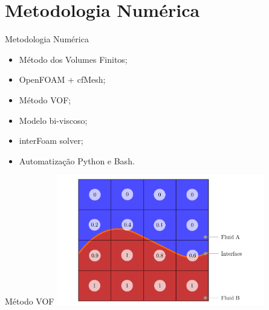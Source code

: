 \section{Metodologia Numérica}

\begin{frame}
    \begin{exampleblock}{Metodologia Numérica}
        \begin{itemize}
            \item Método dos Volumes Finitos;
            \item OpenFOAM + cfMesh;
            \item Método VOF;
            \item Modelo bi-viscoso;
            \item interFoam solver;
            \item Automatização Python e Bash.
        \end{itemize}
    \end{exampleblock}
\end{frame}




\begin{frame}{Método VOF} 
    \centering
    \includegraphics[width=0.68\textwidth]{images/vof.pdf}
\end{frame}

